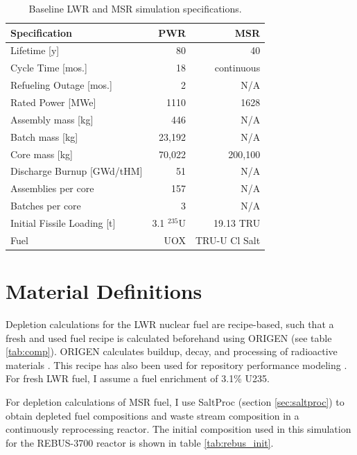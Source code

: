 \begin{table}[h]
	\centering
	\caption{Baseline \gls{LWR} and \gls{MSR} simulation specifications.}
	\begin{tabular}{lrr}
		\hline
		\textbf{Specification} & \textbf{\gls{PWR} \cite{sutharshan_ap1000tm_2011}} & \textbf{\gls{MSR} \cite{mourogov_potentialities_2006}} \\
		\hline
		Lifetime [y]  & 80 & 40 \\
		Cycle Time [mos.]& 18 & continuous \\ 
		Refueling Outage [mos.]& 2 & N/A \\
		Rated Power [\gls{MWe}] & 1110 & 1628 \\
		Assembly mass [kg] & 446 & N/A \\
		Batch mass [kg] & 23,192 & N/A \\
		Core mass [kg] & 70,022 & 200,100 \\
		Discharge Burnup [GWd/tHM] & 51 & N/A \\
		Assemblies per core & 157  & N/A \\
		Batches per core & 3 & N/A \\
		Initial Fissile Loading [t] & 3.1  $^{235}$U & 19.13 \gls{TRU} \\
		Fuel & \gls{UOX} & \gls{TRU}-U Cl Salt \\
		\hline
	\end{tabular}
	\label{tab:us-reactor-specs}
\end{table}


\section{Material Definitions}
Depletion calculations for the \gls{LWR} nuclear fuel are recipe-based, such 
that a fresh and used fuel recipe is calculated beforehand using ORIGEN (see table \ref{tab:comp}).
ORIGEN calculates buildup, decay, and processing of radioactive materials
\cite{parks_overview_1992}. This recipe has also been used for
repository performance modeling \cite{wilson_adoption_2009}.
For fresh \gls{LWR} fuel, I assume a fuel enrichment of 3.1\% U235.

For depletion calculations of \gls{MSR} fuel, I use SaltProc (section \ref{sec:saltproc})
to obtain depleted fuel compositions and waste stream composition in a continuously
reprocessing reactor. The initial composition used in this simulation for the REBUS-3700
reactor is shown in table \ref{tab:rebus_init}.


